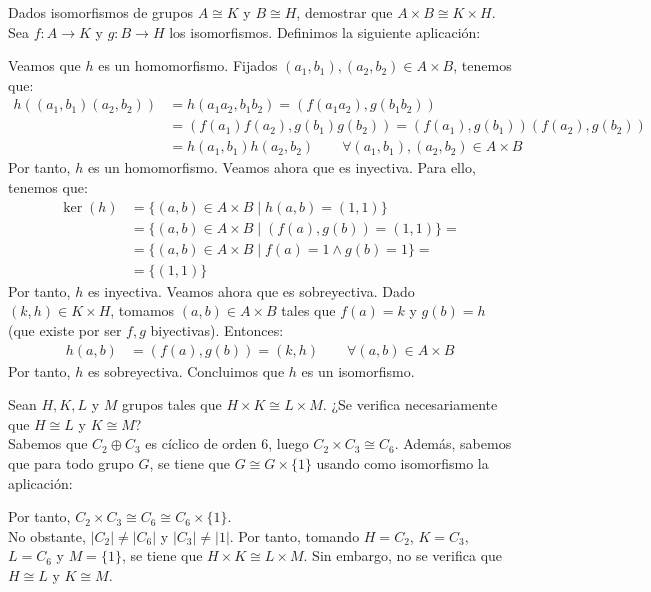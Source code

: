\begin{ejercicio}
    Dados isomorfismos de grupos $A\cong K$ y $B\cong H$, demostrar que $A \times B\cong K\times H$.\\

    Sea $f:A\to K$ y $g:B\to H$ los isomorfismos. Definimos la siguiente aplicación:

    Veamos que $h$ es un homomorfismo. Fijados $(a_1,b_1),(a_2,b_2)\in A\times B$, tenemos que:
    \begin{align*}
        h((a_1,b_1)(a_2,b_2)) &= h(a_1a_2,b_1b_2) = (f(a_1a_2),g(b_1b_2))\\
        &= (f(a_1)f(a_2),g(b_1)g(b_2)) = (f(a_1),g(b_1))(f(a_2),g(b_2))\\
        &= h(a_1,b_1)h(a_2,b_2)\qquad \forall (a_1,b_1),(a_2,b_2)\in A\times B
    \end{align*}
    Por tanto, $h$ es un homomorfismo. Veamos ahora que es inyectiva. Para ello, tenemos que:
    \begin{align*}
        \ker(h) &= \{(a,b)\in A\times B\mid h(a,b)=(1,1)\}\\
        &= \{(a,b)\in A\times B\mid (f(a),g(b))=(1,1)\} =\\&= \{(a,b)\in A\times B\mid f(a)=1\wedge g(b)=1\} =\\&= \{(1,1)\}
    \end{align*}
    Por tanto, $h$ es inyectiva. Veamos ahora que es sobreyectiva. Dado $(k,h)\in K\times H$, tomamos $(a,b)\in A\times B$ tales que $f(a)=k$ y $g(b)=h$ (que existe por ser $f,g$ biyectivas). Entonces:
    \begin{align*}
        h(a,b) &= (f(a),g(b)) = (k,h) \qquad \forall (a,b)\in A\times B
    \end{align*}
    Por tanto, $h$ es sobreyectiva. Concluimos que $h$ es un isomorfismo.

\end{ejercicio}

\begin{ejercicio}
    Sean $H,K,L$ y $M$ grupos tales que $H\times K\cong L\times M$. ¿Se verifica necesariamente que $H\cong L$ y $K\cong M$?\\

    Sabemos que $C_2\oplus C_3$ es cíclico de orden $6$, luego $C_2\times C_3\cong C_6$. Además, sabemos que para todo grupo $G$, se tiene que $G\cong G\times \{1\}$ usando como isomorfismo la aplicación:

    Por tanto, $C_2\times C_3\cong C_6\cong C_6\times \{1\}$.\\

    No obstante, $|C_2|\neq |C_6|$ y $|C_3|\neq |1|$. Por tanto, tomando $H=C_2$, $K=C_3$, $L=C_6$ y $M=\{1\}$, se tiene que $H\times K\cong L\times M$. Sin embargo, no se verifica que $H\cong L$ y $K\cong M$.
\end{ejercicio}

